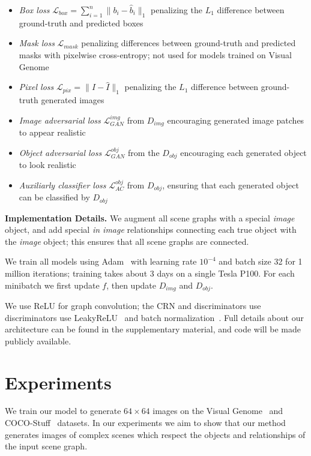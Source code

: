 \documentclass[10pt,twocolumn,letterpaper]{article}
\newcommand{\LL}{\mathcal{L}}
\begin{document}
\begin{itemize}[leftmargin=*]
  \setlength\itemsep{-1mm}
  \item \emph{Box loss} $\LL_{box}=\sum_{i=1}^n\|b_i - \hat b_i\|_1$
    penalizing the $L_1$ difference between ground-truth and predicted boxes
  \item \emph{Mask loss} $\LL_{mask}$ penalizing differences between
    ground-truth and predicted masks with pixelwise
    cross-entropy; not used for models trained on Visual Genome
  \item \emph{Pixel loss} $\LL_{pix}=\|I - \hat I\|_1$ penalizing the
    $L_1$ difference between ground-truth generated images
  \item \emph{Image adversarial loss} $\LL_{GAN}^{img}$ from $D_{img}$
    encouraging generated image patches to appear realistic
  \item \emph{Object adversarial loss} $\LL_{GAN}^{obj}$ from the $D_{obj}$
    encouraging each generated object to look realistic
  \item \emph{Auxiliarly classifier loss} $\LL_{AC}^{obj}$ from $D_{obj}$,
    ensuring that each generated object can be classified by $D_{obj}$
\end{itemize}


\textbf{Implementation Details.}
We augment all scene graphs with a special \emph{image} object, and add
special \emph{in image} relationships connecting each true object with the
\emph{image} object; this ensures that all scene graphs are connected.

We train all models using Adam~\cite{kingma2015adam} with learning rate
$10^{-4}$ and batch size 32 for 1 million iterations; training
takes about 3 days on a single Tesla P100.
For each minibatch we first update $f$, then update $D_{img}$ and $D_{obj}$.

We use ReLU for graph convolution; the CRN and discriminators use 
discriminators use LeakyReLU~\cite{maas2013rectifier} and batch
normalization~\cite{ioffe2015batch}. Full details about our architecture can
be found in the supplementary material, and code will be made publicly available.

 

\section{Experiments}
We train our model to generate $64\times64$ images on the Visual Genome~\cite{krishna2017visual} and COCO-Stuff~\cite{caesar2016coco} datasets. In our experiments
we aim to show that our method generates images of complex scenes which respect
the objects and relationships of the input scene graph.
\end{document}
